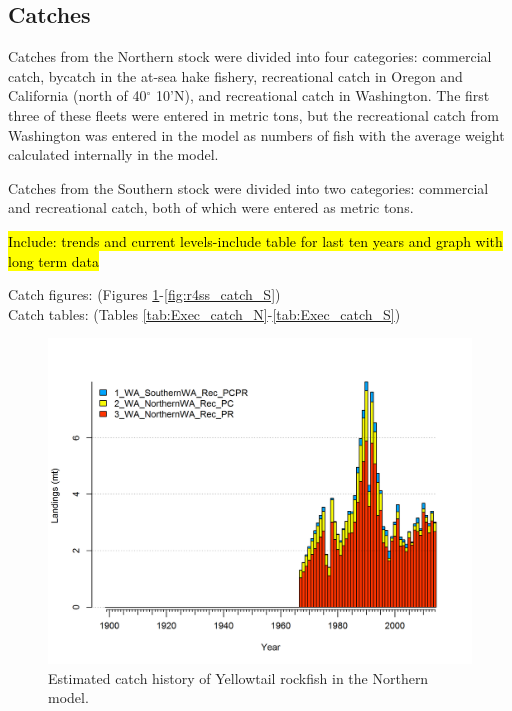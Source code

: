 \documentclass[12pt,]{article}
\begin{document}
\subsection*{Catches}\label{catches}

Catches from the Northern stock were divided into four categories:
commercial catch, bycatch in the at-sea hake fishery, recreational catch
in Oregon and California (north of 40\(^\circ\) 10'N), and recreational
catch in Washington. The first three of these fleets were entered in
metric tons, but the recreational catch from Washington was entered in
the model as numbers of fish with the average weight calculated
internally in the model.

Catches from the Southern stock were divided into two categories:
commercial and recreational catch, both of which were entered as metric
tons.

\hl{Include: trends and current levels-include table for last ten years and graph with 
long term data}

Catch figures: (Figures \ref{fig:r4ss_catch_N}-\ref{fig:r4ss_catch_S})\\
Catch tables: (Tables \ref{tab:Exec_catch_N}-\ref{tab:Exec_catch_S})

\FloatBarrier

\FloatBarrier

\begin{figure}[htbp]
\centering
\includegraphics{r4ss/plots_mod1/catch2 landings stacked.png}
\caption{Estimated catch history of Yellowtail rockfish in the Northern
model. \label{fig:r4ss_catch_N}}
\end{figure}
\end{document}
